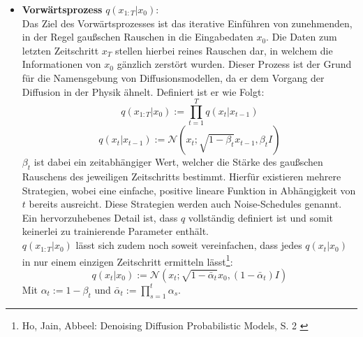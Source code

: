 \begin{itemize}
    \item \textbf{Vorwärtsprozess} $q(x_{1:T}|x_0)$: \\
    Das Ziel des Vorwärtsprozesses ist das iterative Einführen von zunehmenden, in der Regel gaußschen Rauschen in die Eingabedaten $x_0$. Die Daten zum letzten Zeitschritt $x_T$ stellen hierbei reines Rauschen dar, in welchem die Informationen von $x_0$ gänzlich zerstört wurden. Dieser Prozess ist der Grund für die Namensgebung von Diffusionsmodellen, da er dem Vorgang der Diffusion in der Physik ähnelt. Definiert ist er wie Folgt:
    \begin{equation}
        q(x_{1:T}|x_0) := \prod_{t=1}^T q(x_t | x_{t-1}) 
    \end{equation}
    \begin{equation}
        q(x_t|x_{t-1}) :=  \mathcal N(x_t; \sqrt{1-\beta_t}x_{t-1}, \beta_t I)
    \end{equation}
    $\beta_t$ ist dabei ein zeitabhängiger Wert, welcher die Stärke des gaußschen Rauschens des jeweiligen Zeitschritts bestimmt. Hierfür existieren mehrere Strategien, wobei eine einfache, positive lineare Funktion in Abhängigkeit von $t$ bereits ausreicht. Diese Strategien werden auch Noise-Schedules genannt. Ein hervorzuhebenes Detail ist, dass $q$ vollständig definiert ist und somit keinerlei zu trainierende Parameter enthält. \\
    $q(x_{1:T}|x_0)$ lässt sich zudem noch soweit vereinfachen, dass jedes $q(x_t|x_0)$ in nur einem einzigen Zeitschritt ermitteln lässt\footnote{
        Ho, Jain, Abbeel: Denoising Diffusion Probabilistic Models, S. 2
        \cite{ho2020denoisingdiffusionprobabilisticmodels}
    }:
    \begin{equation}
        q(x_t|x_0) :=  
        \mathcal N(x_t; \sqrt{1-\bar\alpha_t}x_0, (1 - \bar \alpha_t) I)
    \end{equation}
    Mit $\alpha_t := 1 - \beta_t$ und $\bar\alpha_t := \prod_{s=1}^t \alpha_s$.


\end{itemize}
